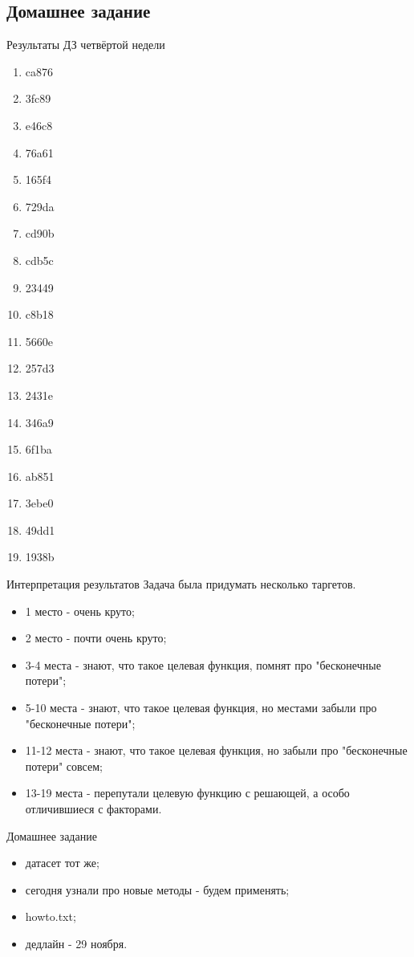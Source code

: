 \documentclass[14pt, fleqn, xcolor={dvipsnames, table}]{beamer}
\begin{document}
\subsection{Домашнее задание}
\begin{frame}{Результаты ДЗ четвёртой недели}
\tiny
\begin{center}
\begin{enumerate}
\item ca876
\item 3fc89
\item e46c8
\item 76a61
\item 165f4
\item 729da
\item cd90b
\item cdb5c
\item 23449
\item c8b18
\item 5660e
\item 257d3
\item 2431e
\item 346a9
\item 6f1ba
\item ab851
\item 3ebe0
\item 49dd1
\item 1938b
\end{enumerate}
\end{center}
\end{frame}

\begin{frame}{Интерпретация результатов}
Задача была придумать несколько таргетов.
\begin{center}
\begin{itemize}
\item 1 место - очень круто;
\item 2 место - почти очень круто;
\item 3-4 места - знают, что такое целевая функция, помнят про "бесконечные потери";
\item 5-10 места - знают, что такое целевая функция, но местами забыли про "бесконечные потери";
\item 11-12 места - знают, что такое целевая функция, но забыли про "бесконечные потери" совсем;
\item 13-19 места - перепутали целевую функцию с решающей, а особо отличившиеся с факторами.
\end{itemize}
\end{center}
\end{frame}

\begin{frame}{Домашнее задание}
\begin{itemize}
\item датасет тот же;
\item сегодня узнали про новые методы - будем применять;
\item howto.txt;
\item дедлайн - 29 ноября.
\end{itemize}
\end{frame}
\end{document}
